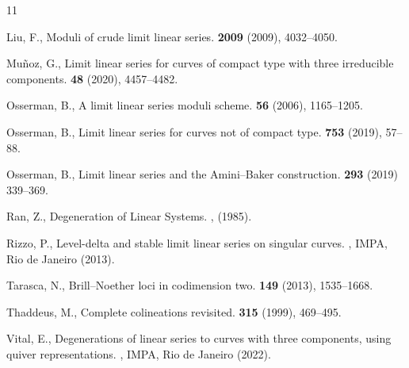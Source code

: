 \documentclass[a4paper,11pt]{amsart}
\theoremstyle{plain}
\theoremstyle{definition}
\theoremstyle{remark}
\begin{document}
\begin{thebibliography}{11}

Liu, F.,
\newblock Moduli of crude limit linear series.
 \textbf{2009} (2009), 4032--4050.

Mu\~noz, G.,
\newblock Limit linear series for curves of compact type with three irreducible components.
 \textbf{48} (2020), 4457--4482.

Osserman, B.,
\newblock A limit linear series moduli scheme.
 \textbf{56} (2006), 1165--1205.

Osserman, B.,
\newblock Limit linear series for curves not of compact type.
 \textbf{753} (2019), 57--88.

Osserman, B., 
\newblock Limit linear series and the Amini--Baker construction.
 \textbf{293} (2019) 339--369.

Ran, Z.,
\newblock Degeneration of Linear Systems.
, (1985).

Rizzo, P.,
\newblock Level-delta and stable limit linear series on singular curves.
, IMPA, Rio de Janeiro (2013).



Tarasca, N.,
\newblock Brill--Noether loci in codimension two.
 \textbf{149} (2013), 1535--1668.

Thaddeus, M., 
\newblock Complete colineations revisited.
 \textbf{315} (1999), 469--495.

Vital, E.,
\newblock Degenerations of linear series to curves with three components, using quiver representations.
, IMPA, Rio de Janeiro (2022).

\end{thebibliography}
\end{document}
